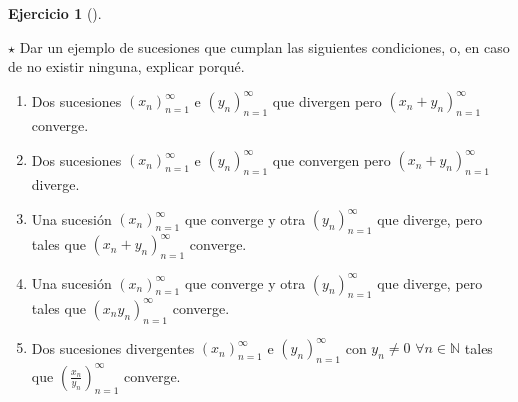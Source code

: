 \documentclass[
  a4paper,
]{scrreport}
\providecommand{\tightlist}{%
  \setlength{\itemsep}{0pt}\setlength{\parskip}{0pt}}\usepackage{longtable,booktabs,array}
\theoremstyle{definition}
\newtheorem{exercise}{Ejercicio}[chapter]
\theoremstyle{remark}
\begin{document}
\leavevmode{}%
\begin{exercise}[]\label{exr-ejemplo-sucesiones-2}

\(\star\) Dar un ejemplo de sucesiones que cumplan las siguientes
condiciones, o, en caso de no existir ninguna, explicar porqué.

\begin{enumerate}
\def\labelenumi{\alph{enumi}.}
\tightlist
\item
  Dos sucesiones \((x_n)_{n=1}^\infty\) e \((y_n)_{n=1}^\infty\) que
  divergen pero \((x_n+y_n)_{n=1}^\infty\) converge.
\item
  Dos sucesiones \((x_n)_{n=1}^\infty\) e \((y_n)_{n=1}^\infty\) que
  convergen pero \((x_n+y_n)_{n=1}^\infty\) diverge.
\item
  Una sucesión \((x_n)_{n=1}^\infty\) que converge y otra
  \((y_n)_{n=1}^\infty\) que diverge, pero tales que
  \((x_n+y_n)_{n=1}^\infty\) converge.
\item
  Una sucesión \((x_n)_{n=1}^\infty\) que converge y otra
  \((y_n)_{n=1}^\infty\) que diverge, pero tales que
  \((x_ny_n)_{n=1}^\infty\) converge.
\item
  Dos sucesiones divergentes \((x_n)_{n=1}^\infty\) e
  \((y_n)_{n=1}^\infty\) con \(y_n\neq 0\) \(\forall n\in\mathbb{N}\)
  tales que \(\left(\frac{x_n}{y_n}\right)_{n=1}^\infty\) converge.
\end{enumerate}

\end{exercise}
\end{document}
